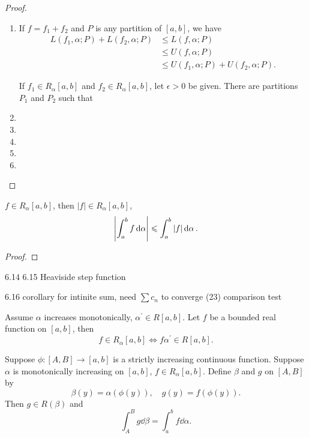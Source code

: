 \begin{proof} \
\begin{enumerate}[label=(\roman*)]
\item If $f=f_1+f_2$ and $P$ is any partition of $[a,b]$, we have
\begin{align*}
L(f_1,\alpha;P)+L(f_2,\alpha;P)&\le L(f,\alpha;P)\\
&\le U(f,\alpha;P)\\
&\le U(f_1,\alpha;P)+U(f_2,\alpha;P).
\end{align*}

If $f_1\in R_\alpha[a,b]$ and $f_2\in R_\alpha[a,b]$, let $\epsilon>0$ be given. There are partitions $P_1$ and $P_2$ such that


\item 
\item 
\item 
\item 
\item 
\end{enumerate}
\end{proof}

\begin{theorem}
$f\in R_\alpha[a,b]$, then $|f|\in R_\alpha[a,b]$,
\[ \left|\int_a^bf\dd{\alpha}\right|\leqslant\int_a^b|f|\dd{\alpha}. \]
\end{theorem}

\begin{proof}

\end{proof}

6.14 6.15
Heaviside step function

6.16 corollary
for intinite sum, need $\sum c_n$ to converge
(23) comparison test

\begin{proposition}
Assume $\alpha$ increases monotonically, $\alpha^\prime\in R[a,b]$. Let $f$ be a bounded real function on $[a,b]$, then
\[f\in R_\alpha[a,b]\iff f\alpha^\prime\in R[a,b].\]
\end{proposition}

\begin{proposition}
Suppose $\phi:[A,B]\to[a,b]$ is a strictly increasing continuous function. Suppose $\alpha$ is monotonically increasing on $[a,b]$, $f\in R_\alpha[a,b]$. Define $\beta$ and $g$ on $[A,B]$ by
\[\beta(y)=\alpha(\phi(y)),\quad g(y)=f(\phi(y)).\]
Then $g\in R(\beta)$ and
\[\int_A^B g\dd{\beta}=\int_a^b f\dd{\alpha}.\]
\end{proposition}

